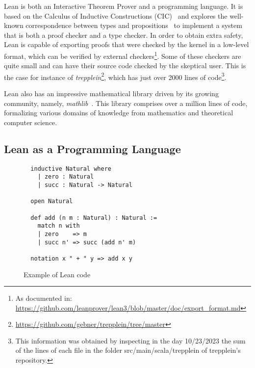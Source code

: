 
Lean is both an Interactive Theorem Prover and a programming language.
%
It is based on the Calculus of Inductive Constructions (CIC)~\cite{cic_ref}
and explores the well-known correspondence between types and
propositions~\cite{ch_correspondence} to implement a system that is both a
proof checker and a type checker.
%
In order to obtain extra safety, Lean is capable of exporting proofs that
were checked by the kernel in a low-level format, which can be verified
by external checkers\footnote{As documented in:
\url{https://github.com/leanprover/lean3/blob/master/doc/export_format.md}}.
%
Some of these checkers are quite small and can have their source code
checked by the skeptical user. This is the case for instance of
\textit{trepplein}\footnote{\url{https://github.com/gebner/trepplein/tree/master}},
which has just over 2000 lines of code\footnote{This information was obtained by
inspecting in the day 10/23/2023 the sum of the lines of each file in the folder
src/main/scala/trepplein of trepplein's repository.}.


%
Lean also has an impressive mathematical library driven by its growing
community, namely, \textit{mathlib}~\cite{mathlib}.
%
This library comprises over a million lines of code, formalizing various
domains of knowledge from mathematics and theoretical computer science.

\subsection{Lean as a Programming Language}


\begin{figure}[t]
\begin{verbatim}
  inductive Natural where
    | zero : Natural
    | succ : Natural -> Natural

  open Natural

  def add (n m : Natural) : Natural :=
    match n with
    | zero    => m
    | succ n' => succ (add n' m)

  notation x " + " y => add x y
\end{verbatim}
\caption{Example of Lean code}\label{leanAdd}
\end{figure}

